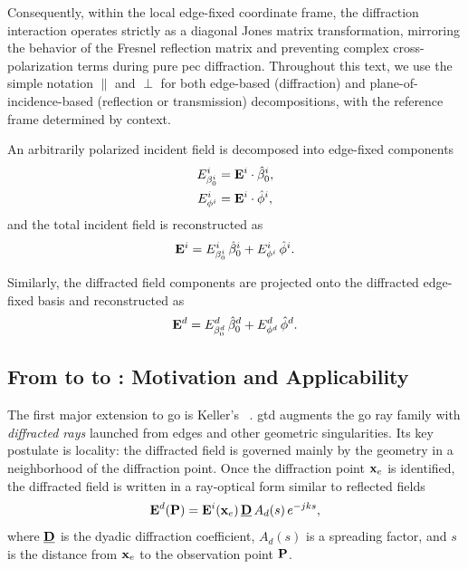 Consequently, within the local edge-fixed coordinate frame, the diffraction interaction operates strictly as a diagonal Jones matrix transformation, mirroring the behavior of the Fresnel reflection matrix and preventing complex cross-polarization terms during pure \gls{pec} diffraction. Throughout this text, we use the simple notation $\parallel$ and $\perp$ for both edge-based (diffraction) and plane-of-incidence-based (reflection or transmission) decompositions, with the reference frame determined by context.

An arbitrarily polarized incident field is decomposed into edge-fixed components
\begin{align}
  E_{\beta_0^i}^i &= \mathbf{E}^i \cdot \hat{\mathbf{\beta}}_0^i, \\
  E_{\phi^i}^i &= \mathbf{E}^i \cdot \hat{\mathbf{\phi}}^i,
\end{align}
and the total incident field is reconstructed as
\begin{equation}
  \mathbf{E}^i = E_{\beta_0^i}^i\,\hat{\mathbf{\beta}}_0^i + E_{\phi^i}^i\,\hat{\mathbf{\phi}}^i.
\end{equation}

Similarly, the diffracted field components are projected onto the diffracted edge-fixed basis and reconstructed as
\begin{equation}
  \mathbf{E}^d = E_{\beta_0^d}^d\,\hat{\mathbf{\beta}}_0^d + E_{\phi^d}^d\,\hat{\mathbf{\phi}}^d.
\end{equation}

\subsection{From  to  to : Motivation and Applicability}

The first major extension to \gls{go} is Keller's ~. \gls{gtd} augments the \gls{go} ray family with \emph{diffracted rays} launched from edges and other geometric singularities. Its key postulate is locality: the diffracted field is governed mainly by the geometry in a neighborhood of the diffraction point. Once the diffraction point $\mathbf{x}_e$ is identified, the diffracted field is written in a ray-optical form similar to reflected fields
\begin{equation}
  \mathbf{E}^{d}(\mathbf{P}) = \mathbf{E}^{i}(\mathbf{x}_e)\,\underline{\mathbf{D}}\,A_d(s)\,e^{-jks},
\end{equation}
where $\underline{\mathbf{D}}$ is the dyadic diffraction coefficient, $A_d(s)$ is a spreading factor, and $s$ is the distance from $\mathbf{x}_e$ to the observation point $\mathbf{P}$.


